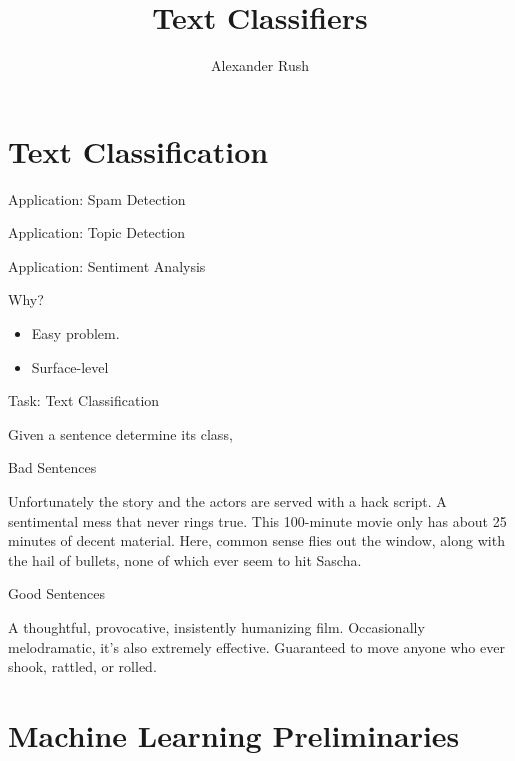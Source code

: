 \documentclass{beamer}
\title{Text Classifiers}
\author{Alexander Rush}
\begin{document}
\begin{frame}
  \titlepage
\end{frame}

\section{Text Classification}

\begin{frame}{Application: Spam Detection}

\end{frame}

\begin{frame}{Application: Topic Detection}

\end{frame}

\begin{frame}{Application: Sentiment Analysis}
  
\end{frame}

\begin{frame}{Why?}
  \begin{itemize}
  \item Easy problem.
  \end{itemize}
  \begin{itemize}
  \item Surface-level
  \end{itemize}
\end{frame}

\begin{frame}{Task: Text Classification}

  Given a sentence determine its class, 

  Bad Sentences

  Unfortunately the story and the actors are served with a hack script. 
  A sentimental mess that never rings true.
  This 100-minute movie only has about 25 minutes of decent material.  
  Here, common sense flies out the window, along with the hail of bullets, none of which ever seem to hit Sascha. 

  Good Sentences
  
  A thoughtful, provocative, insistently humanizing film. 
  Occasionally melodramatic, it's also extremely effective.
  Guaranteed to move anyone who ever shook, rattled, or rolled.   
\end{frame}


\section{Machine Learning Preliminaries}
\end{document}
